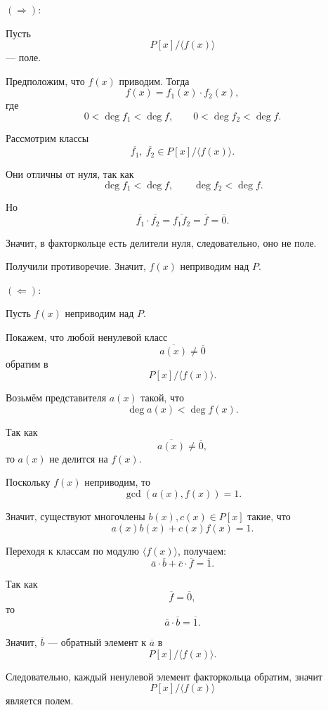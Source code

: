 \begin{Proof}
    {\bf $(\Rightarrow):$}

    Пусть
    \[
        P[x]/\langle f(x) \rangle
    \]
    --- поле.

    Предположим, что $f(x)$ приводим. Тогда
    \[
        f(x)=f_1(x)\cdot f_2(x),
    \]
    где
    \[
        0 < \deg f_1 < \deg f,\qquad 0 < \deg f_2 < \deg f.
    \]

    Рассмотрим классы
    \[
        \overline{f_1},\ \overline{f_2} \in P[x]/\langle f(x) \rangle.
    \]

    Они отличны от нуля, так как
    \[
        \deg f_1 < \deg f,\qquad \deg f_2 < \deg f.
    \]

    Но
    \[
        \overline{f_1}\cdot \overline{f_2}
        =
        \overline{f_1f_2}
        =
        \overline{f}
        =
        \overline{0}.
    \]

    Значит, в факторкольце есть делители нуля, следовательно, оно не поле.

    Получили противоречие. Значит, $f(x)$ неприводим над $P$.

    \bigskip

    {\bf $(\Leftarrow):$}

    Пусть $f(x)$ неприводим над $P$.

    Покажем, что любой ненулевой класс
    \[
        \overline{a(x)} \neq \overline{0}
    \]
    обратим в
    \[
        P[x]/\langle f(x) \rangle.
    \]

    Возьмём представителя $a(x)$ такой, что
    \[
        \deg a(x) < \deg f(x).
    \]

    Так как
    \[
        \overline{a(x)} \neq \overline{0},
    \]
    то $a(x)$ не делится на $f(x)$.

    Поскольку $f(x)$ неприводим, то
    \[
        \gcd(a(x), f(x)) = 1.
    \]

    Значит, существуют многочлены $b(x), c(x) \in P[x]$ такие, что
    \[
        a(x)b(x) + c(x)f(x) = 1.
    \]

    Переходя к классам по модулю $\langle f(x) \rangle$, получаем:
    \[
        \overline{a}\cdot \overline{b} + \overline{c}\cdot \overline{f}
        =
        \overline{1}.
    \]

    Так как
    \[
        \overline{f} = \overline{0},
    \]
    то
    \[
        \overline{a}\cdot \overline{b} = \overline{1}.
    \]

    Значит, $\overline{b}$ --- обратный элемент к $\overline{a}$ в
    \[
        P[x]/\langle f(x) \rangle.
    \]

    Следовательно, каждый ненулевой элемент факторкольца обратим, значит
    \[
        P[x]/\langle f(x) \rangle
    \]
    является полем.
\end{Proof}
